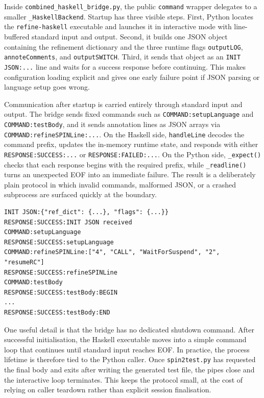 Inside \texttt{combined\_haskell\_bridge.py}, the public
\texttt{command} wrapper delegates to a smaller
\texttt{\_HaskellBackend}. Startup has three visible steps. First,
Python locates the \texttt{refine-haskell} executable and launches it
in interactive mode with line-buffered standard input and output.
Second, it builds one JSON object containing the refinement
dictionary and the three runtime flags
\texttt{outputLOG}, \texttt{annoteComments}, and
\texttt{outputSWITCH}. Third, it sends that object as an
\texttt{INIT JSON:...} line and waits for a success response before
continuing. This makes configuration loading explicit and gives one
early failure point if JSON parsing or language setup goes wrong.

Communication after startup is carried entirely through standard input
and output. The bridge sends fixed commands such as
\texttt{COMMAND:setupLanguage} and \texttt{COMMAND:testBody}, and it
sends annotation lines as JSON arrays via
\texttt{COMMAND:refineSPINLine:...}. On the Haskell side,
\texttt{handleLine} decodes the command prefix, updates the in-memory
runtime state, and responds with either
\texttt{RESPONSE:SUCCESS:...} or \texttt{RESPONSE:FAILED:...}. On the
Python side, \texttt{\_expect()} checks that each response begins
with the required prefix, while \texttt{\_readline()} turns an
unexpected EOF into an immediate failure. The result is a deliberately
plain protocol in which invalid commands, malformed JSON, or a crashed
subprocess are surfaced quickly at the boundary.

\begin{lstlisting}[caption={Short request-response exchange used during refinement}, label={lst:bridge-runtime-exchange}]
INIT JSON:{"ref_dict": {...}, "flags": {...}}
RESPONSE:SUCCESS:INIT JSON received
COMMAND:setupLanguage
RESPONSE:SUCCESS:setupLanguage
COMMAND:refineSPINLine:["4", "CALL", "WaitForSuspend", "2", "resumeRC"]
RESPONSE:SUCCESS:refineSPINLine
COMMAND:testBody
RESPONSE:SUCCESS:testBody:BEGIN
...
RESPONSE:SUCCESS:testBody:END
\end{lstlisting}

One useful detail is that the bridge has no dedicated shutdown
command. After successful initialisation, the Haskell executable moves
into a simple command loop that continues until standard input reaches
EOF. In practice, the process lifetime is therefore tied to the
Python caller. Once \texttt{spin2test.py} has requested the final body
and exits after writing the generated test file, the pipes close and
the interactive loop terminates. This keeps the protocol small, at the
cost of relying on caller teardown rather than explicit session
finalisation.

